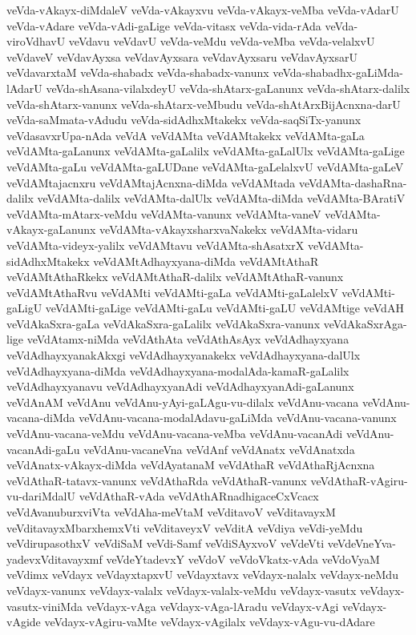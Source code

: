 {veVda-vAkayx-diMdaleV
veVda-vAkayxvu
veVda-vAkayx-veMba
veVda-vAdarU
veVda-vAdare
veVda-vAdi-gaLige
veVda-vitasx
veVda-vida-rAda
veVda-viroVdhavU
veVdavu
veVdavU
veVda-veMdu
veVda-veMba
veVda-velalxvU
veVdaveV
veVdavAyxsa
veVdavAyxsara
veVdavAyxsaru
veVdavAyxsarU
veVdavarxtaM
veVda-shabadx
veVda-shabadx-vanunx
veVda-shabadhx-gaLiMda-lAdarU
veVda-shAsana-vilalxdeyU
veVda-shAtarx-gaLanunx
veVda-shAtarx-dalilx
veVda-shAtarx-vanunx
veVda-shAtarx-veMbudu
veVda-shAtArxBijAcnxna-darU
veVda-saMmata-vAdudu
veVda-sidAdhxMtakekx
veVda-saqSiTx-yanunx
veVdasavxrUpa-nAda
veVdA
veVdAMta
veVdAMtakekx
veVdAMta-gaLa
veVdAMta-gaLanunx
veVdAMta-gaLalilx
veVdAMta-gaLalUlx
veVdAMta-gaLige
veVdAMta-gaLu
veVdAMta-gaLUDane
veVdAMta-gaLelalxvU
veVdAMta-gaLeV
veVdAMtajacnxru
veVdAMtajAcnxna-diMda
veVdAMtada
veVdAMta-dashaRna-dalilx
veVdAMta-dalilx
veVdAMta-dalUlx
veVdAMta-diMda
veVdAMta-BAratiV
veVdAMta-mAtarx-veMdu
veVdAMta-vanunx
veVdAMta-vaneV
veVdAMta-vAkayx-gaLanunx
veVdAMta-vAkayxsharxvaNakekx
veVdAMta-vidaru
veVdAMta-videyx-yalilx
veVdAMtavu
veVdAMta-shAsatxrX
veVdAMta-sidAdhxMtakekx
veVdAMtAdhayxyana-diMda
veVdAMtAthaR
veVdAMtAthaRkekx
veVdAMtAthaR-dalilx
veVdAMtAthaR-vanunx
veVdAMtAthaRvu
veVdAMti
veVdAMti-gaLa
veVdAMti-gaLalelxV
veVdAMti-gaLigU
veVdAMti-gaLige
veVdAMti-gaLu
veVdAMti-gaLU
veVdAMtige
veVdAH
veVdAkaSxra-gaLa
veVdAkaSxra-gaLalilx
veVdAkaSxra-vanunx
veVdAkaSxrAga-lige
veVdAtamx-niMda
veVdAthAta
veVdAthAsAyx
veVdAdhayxyana
veVdAdhayxyanakAkxgi
veVdAdhayxyanakekx
veVdAdhayxyana-dalUlx
veVdAdhayxyana-diMda
veVdAdhayxyana-modalAda-kamaR-gaLalilx
veVdAdhayxyanavu
veVdAdhayxyanAdi
veVdAdhayxyanAdi-gaLanunx
veVdAnAM
veVdAnu
veVdAnu-yAyi-gaLAgu-vu-dilalx
veVdAnu-vacana
veVdAnu-vacana-diMda
veVdAnu-vacana-modalAdavu-gaLiMda
veVdAnu-vacana-vanunx
veVdAnu-vacana-veMdu
veVdAnu-vacana-veMba
veVdAnu-vacanAdi
veVdAnu-vacanAdi-gaLu
veVdAnu-vacaneVna
veVdAnf
veVdAnatx
veVdAnatxda
veVdAnatx-vAkayx-diMda
veVdAyatanaM
veVdAthaR
veVdAthaRjAcnxna
veVdAthaR-tatavx-vanunx
veVdAthaRda
veVdAthaR-vanunx
veVdAthaR-vAgiru-vu-dariMdalU
veVdAthaR-vAda
veVdAthARnadhigaceCxVcacx
veVdAvanuburxviVta
veVdAha-meVtaM
veVditavoV
veVditavayxM
veVditavayxMbarxhemxVti
veVditaveyxV
veVditA
veVdiya
veVdi-yeMdu
veVdirupasothxV
veVdiSaM
veVdi-Samf
veVdiSAyxvoV
veVdeVti
veVdeVneYva-yadevxVditavayxmf
veVdeYtadevxY
veVdoV
veVdoVkatx-vAda
veVdoVyaM
veVdimx
veVdayx
veVdayxtapxvU
veVdayxtavx
veVdayx-nalalx
veVdayx-neMdu
veVdayx-vanunx
veVdayx-valalx
veVdayx-valalx-veMdu
veVdayx-vasutx
veVdayx-vasutx-viniMda
veVdayx-vAga
veVdayx-vAga-lAradu
veVdayx-vAgi
veVdayx-vAgide
veVdayx-vAgiru-vaMte
veVdayx-vAgilalx
veVdayx-vAgu-vu-dAdare
}
